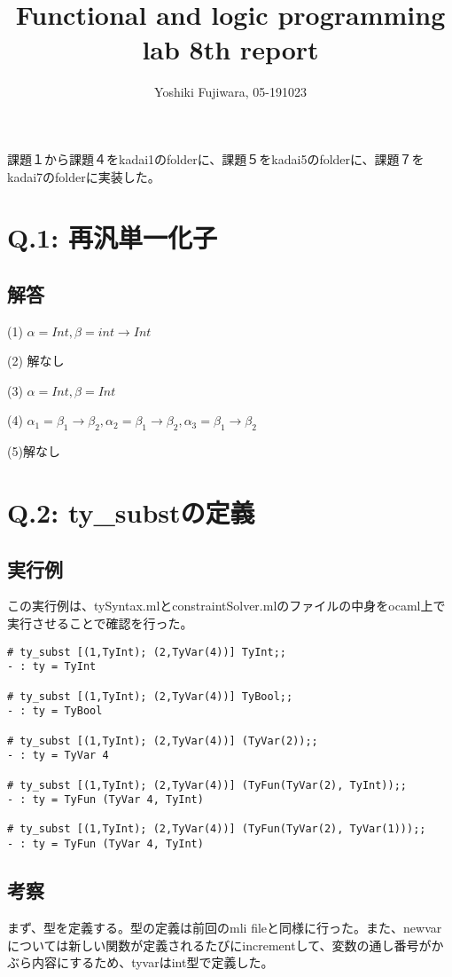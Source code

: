 \documentclass[uplatex,12pt]{jsarticle}
\title {Functional and logic programming lab 8th report}
\date{}
\begin{document}
\author{Yoshiki Fujiwara, 05-191023}
\maketitle

課題１から課題４をkadai1のfolderに、課題５をkadai5のfolderに、課題７をkadai7のfolderに実装した。

\section{Q.1: 再汎単一化子}
\subsection{解答}

(1) $\alpha = Int, \beta = int \rightarrow Int$

(2) 解なし

(3) $\alpha = Int, \beta = Int$

(4) $\alpha_1 = \beta_1 \rightarrow \beta_2, \alpha_2 = \beta_1 \rightarrow \beta_2, \alpha_3 = \beta_1 \rightarrow \beta_2$

(5)解なし

\section{Q.2: ty\_substの定義}
\subsection{実行例}
この実行例は、tySyntax.mlとconstraintSolver.mlのファイルの中身をocaml上で実行させることで確認を行った。
\begin{lstlisting}[caption=動作例]
# ty_subst [(1,TyInt); (2,TyVar(4))] TyInt;;
- : ty = TyInt

# ty_subst [(1,TyInt); (2,TyVar(4))] TyBool;;
- : ty = TyBool

# ty_subst [(1,TyInt); (2,TyVar(4))] (TyVar(2));;
- : ty = TyVar 4

# ty_subst [(1,TyInt); (2,TyVar(4))] (TyFun(TyVar(2), TyInt));;
- : ty = TyFun (TyVar 4, TyInt)

# ty_subst [(1,TyInt); (2,TyVar(4))] (TyFun(TyVar(2), TyVar(1)));;
- : ty = TyFun (TyVar 4, TyInt)

\end{lstlisting}

\subsection{考察}
まず、型を定義する。型の定義は前回のmli fileと同様に行った。また、newvarについては新しい関数が定義されるたびにincrementして、変数の通し番号がかぶら内容にするため、tyvarはint型で定義した。
\end{document}
